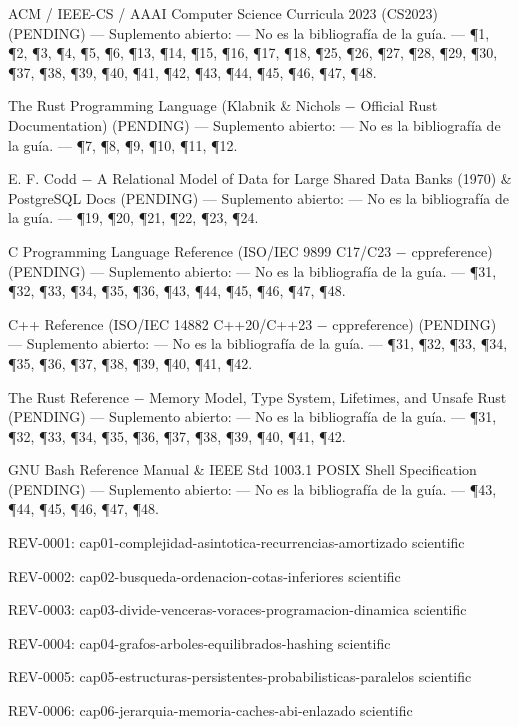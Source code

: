 \documentclass{book}
\begin{document}
\noindent ACM / IEEE-CS / AAAI Computer Science Curricula 2023 (CS2023) (PENDING) --- Suplemento abierto: --- No es la bibliografía de la guía. --- \P1, \P2, \P3, \P4, \P5, \P6, \P13, \P14, \P15, \P16, \P17, \P18, \P25, \P26, \P27, \P28, \P29, \P30, \P37, \P38, \P39, \P40, \P41, \P42, \P43, \P44, \P45, \P46, \P47, \P48.

\noindent The Rust Programming Language (Klabnik \& Nichols \(-\) Official Rust Documentation) (PENDING) --- Suplemento abierto: --- No es la bibliografía de la guía. --- \P7, \P8, \P9, \P10, \P11, \P12.

\noindent E. F. Codd \(-\) A Relational Model of Data for Large Shared Data Banks (1970) \& PostgreSQL Docs (PENDING) --- Suplemento abierto: --- No es la bibliografía de la guía. --- \P19, \P20, \P21, \P22, \P23, \P24.

\noindent C Programming Language Reference (ISO/IEC 9899 C17/C23 \(-\) cppreference) (PENDING) --- Suplemento abierto: --- No es la bibliografía de la guía. --- \P31, \P32, \P33, \P34, \P35, \P36, \P43, \P44, \P45, \P46, \P47, \P48.

\noindent C++ Reference (ISO/IEC 14882 C++20/C++23 \(-\) cppreference) (PENDING) --- Suplemento abierto: --- No es la bibliografía de la guía. --- \P31, \P32, \P33, \P34, \P35, \P36, \P37, \P38, \P39, \P40, \P41, \P42.

\noindent The Rust Reference \(-\) Memory Model, Type System, Lifetimes, and Unsafe Rust (PENDING) --- Suplemento abierto: --- No es la bibliografía de la guía. --- \P31, \P32, \P33, \P34, \P35, \P36, \P37, \P38, \P39, \P40, \P41, \P42.

\noindent GNU Bash Reference Manual \& IEEE Std 1003.1 POSIX Shell Specification (PENDING) --- Suplemento abierto: --- No es la bibliografía de la guía. --- \P43, \P44, \P45, \P46, \P47, \P48.

\noindent REV-0001: cap01-complejidad-asintotica-recurrencias-amortizado scientific

\noindent REV-0002: cap02-busqueda-ordenacion-cotas-inferiores scientific

\noindent REV-0003: cap03-divide-venceras-voraces-programacion-dinamica scientific

\noindent REV-0004: cap04-grafos-arboles-equilibrados-hashing scientific

\noindent REV-0005: cap05-estructuras-persistentes-probabilisticas-paralelos scientific

\noindent REV-0006: cap06-jerarquia-memoria-caches-abi-enlazado scientific
\end{document}
